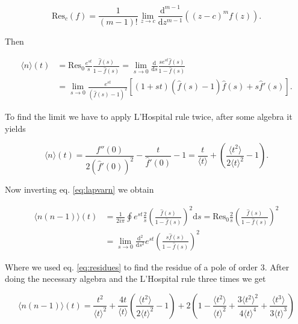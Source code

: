 \begin{equation}
  \label{eq:residues}
  \text{Res}_c(f)=\frac{1}{(m-1)!}\lim_{z\to c}\frac{\mathrm{d}^{m-1}}{\mathrm{d}z^{m-1}}((z-c)^mf(z)).
\end{equation}

Then

\begin{equation*}
  \begin{split}
    \langle n\rangle(t)&=\text{Res}_0\frac{e^{st}}{s}\frac{\hat{f}(s)}{1-\hat{f}(s)}=\lim_{s\to0}\frac{\mathrm{d}}{\mathrm{d}s}\frac{se^{st}\hat{f}(s)}{1-\hat{f}(s)}\\
    & = \lim_{s\to0}\frac{e^{st}}{(\hat{f}(s)-1)^2}\left[(1+st)(\hat{f}(s)-1)\hat{f}(s) + s\hat{f}'(s)\right].
  \end{split}
\end{equation*}

To find the limit we have to apply L'Hospital rule twice, after some algebra it yields

\begin{equation}
  \label{eq:aven}
  \langle n\rangle(t)=\frac{\hat{f}''(0)}{2(\hat{f}'(0))^2}-\frac{t}{\hat{f}'(0)}-1=\frac{t}{\langle t\rangle}+\left(\frac{\langle t^2\rangle}{2\langle t\rangle^2}-1\right).
\end{equation}

Now inverting eq. \eqref{eq:lapvarn} we obtain

\begin{equation*}
  \begin{split}
    \langle n(n-1)\rangle(t)&=\frac{1}{2i\pi}\oint e^{st}\frac{2}{s}\left(\frac{\hat{f}(s)}{1-\hat{f}(s)}\right)^2\mathrm{d}s=\text{Res}_0\frac{2}{s}\left(\frac{\hat{f}(s)}{1-\hat{f}(s)}\right)^2\\
&=\lim_{s\to0}\frac{\mathrm{d}^2}{\mathrm{d}s^2}e^{st}\left(\frac{s\hat{f}(s)}{1-\hat{f}(s)}\right)^2
  \end{split}
\end{equation*}

Where we used eq. \eqref{eq:residues} to find the residue of a pole of order $3$. After doing the necessary algebra and the L'Hospital rule three times we get

\begin{equation*}
  \langle n(n-1)\rangle(t)=\frac{t^2}{\langle t\rangle^2}+\frac{4t}{\langle t\rangle}\left(\frac{\langle t^2\rangle}{2\langle t\rangle^2}-1\right)+2\left(1-\frac{\langle t^2\rangle}{\langle t\rangle^2}+\frac{3\langle t^2\rangle^2}{4\langle t\rangle^4}+\frac{\langle t^3\rangle}{3\langle t\rangle^3}\right)
\end{equation*}

